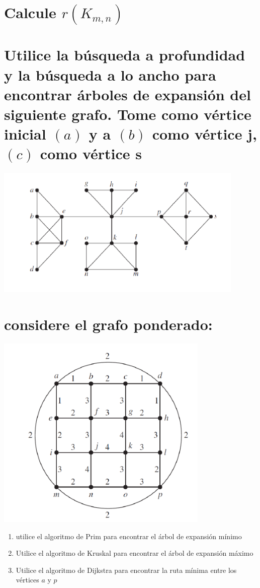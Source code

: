 \documentclass[10pt,a4paper]{article} %
\begin{document}




   \section{Calcule $ r(K_{m,n})$}




   \section{Utilice la búsqueda a profundidad y la búsqueda a lo ancho para
   encontrar árboles de expansión del siguiente grafo. Tome como vértice
   inicial $(a)$ y a $(b)$ como vértice  j, $(c)$ como vértice s}
       \begin{center}
       \includegraphics[width=0.5\linewidth]{grafop9.png}
       \end{center}




   \section{considere el grafo ponderado:}
        \begin{center}
            \includegraphics[width=0.4\linewidth]{grafop10}
        \end{center}
        \begin{enumerate}
            \item {utilice el algoritmo de Prim para encontrar el árbol de
                expansión mínimo}
            \item {Utilice el algoritmo de Kruskal para encontrar el árbol de expansión máximo}
            \item {Utilice el algoritmo de Dijkstra para encontrar la ruta
                mínima entre los vértices $a$ y $p$}
        \end{enumerate}
\end{document}

